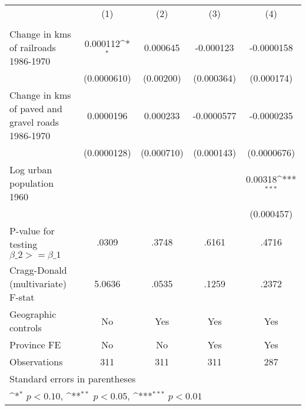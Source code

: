 {
\def\sym#1{\ifmmode^{#1}\else\(^{#1}\)\fi}
\begin{tabular}{l*{4}{c}}
\hline\hline
                &\multicolumn{1}{c}{(1)}&\multicolumn{1}{c}{(2)}&\multicolumn{1}{c}{(3)}&\multicolumn{1}{c}{(4)}\\
                &\multicolumn{1}{c}{}&\multicolumn{1}{c}{}&\multicolumn{1}{c}{}&\multicolumn{1}{c}{}\\
\hline
Change in kms of railroads 1986-1970& 0.000112\sym{*}  & 0.000645         &-0.000123         &-0.0000158         \\
                &(0.0000610)         &(0.00200)         &(0.000364)         &(0.000174)         \\
[1em]
Change in kms of paved and gravel roads 1986-1970&0.0000196         & 0.000233         &-0.0000577         &-0.0000235         \\
                &(0.0000128)         &(0.000710)         &(0.000143)         &(0.0000676)         \\
[1em]
Log urban population 1960&                  &                  &                  &  0.00318\sym{***}\\
                &                  &                  &                  &(0.000457)         \\
\hline
P-value for testing $\beta\_{2} >= \beta\_{1}$&    .0309         &    .3748         &    .6161         &    .4716         \\
Cragg-Donald (multivariate) F-stat&   5.0636         &    .0535         &    .1259         &    .2372         \\
Geographic controls&       No         &      Yes         &      Yes         &      Yes         \\
Province FE     &       No         &       No         &      Yes         &      Yes         \\
Observations    &      311         &      311         &      311         &      287         \\
\hline\hline
\multicolumn{5}{l}{\footnotesize Standard errors in parentheses}\\
\multicolumn{5}{l}{\footnotesize \sym{*} \(p<0.10\), \sym{**} \(p<0.05\), \sym{***} \(p<0.01\)}\\
\end{tabular}
}
